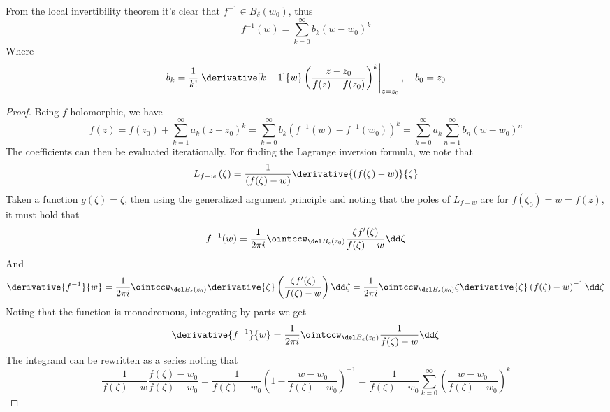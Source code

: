 \documentclass[../mmf.tex]{subfiles}
\begin{document}
\begin{thm}
	From the local invertibility theorem it's clear that $f^{-1}\in B_{\delta}(w_0)$, thus
	\begin{equation*}
		f^{-1}\left( w \right)=\sum_{k=0}^{\infty}b_k(w-w_0)^k
	\end{equation*}
	Where
	\begin{equation}
		b_k=\frac{1}{k!}\left.\derivative[k-1]{w}\left( \frac{z-z_0}{f(z)-f(z_0)} \right)^k\right|_{z=z_0}, \quad b_0=z_0
		\label{eq:lagrangeformula}
	\end{equation}
\end{thm}
\begin{proof}
	Being $f$ holomorphic, we have
	\begin{equation*}
		f(z)=f(z_0)+\sum_{k=1}^{\infty}a_k\left( z-z_0 \right)^k=\sum_{k=0}^{\infty}b_k\left( f^{-1}(w)-f^{-1}(w_0) \right)^k=\sum_{k=0}^{\infty}a_k\sum_{n=1}^{\infty}b_n\left( w-w_0 \right)^n
	\end{equation*}
	The coefficients can then be evaluated iterationally. For finding the Lagrange inversion formula, we note that
	\begin{equation*}
		L_{f-w}\left( \zeta \right)=\frac{1}{\left( f(\zeta)-w \right)}\derivative{\left( f(\zeta)-w \right)}{\zeta}
	\end{equation*}
	Taken a function $g(\zeta)=\zeta$, then using the generalized argument principle and noting that the poles of $L_{f-w}$ are for $f(\zeta_0)=w=f(z)$, it must hold that
	\begin{equation*}
		f^{-1}(w)= \frac{1}{2\pi i}\ointccw_{\del B_{\epsilon}(z_0)}\frac{\zeta f'(\zeta)}{f(\zeta)-w}\dd\zeta
	\end{equation*}
		And
	\begin{equation*}
		\derivative{f^{-1}}{w}=\frac{1}{2\pi i}\ointccw_{\del B_{\epsilon}(z_0)}\derivative{\zeta}\left( \frac{\zeta f'(\zeta)}{f(\zeta)-w} \right)\dd\zeta= \frac{1}{2\pi i}\ointccw_{\del B_{\epsilon}(z_0)}\zeta\derivative{\zeta}\left( f(\zeta)-w \right)^{-1}\dd\zeta
	\end{equation*}
	Noting that the function is monodromous, integrating by parts we get
	\begin{equation*}
		\derivative{f^{-1}}{w}=\frac{1}{2\pi i}\ointccw_{\del B_{\epsilon}(z_0)}\frac{1}{f(\zeta)-w}\dd\zeta
	\end{equation*}
	The integrand can be rewritten as a series noting that
	\begin{equation*}
		\frac{1}{f(\zeta)-w}\frac{f(\zeta)-w_0}{f(\zeta)-w_0}=\frac{1}{f(\zeta)-w_0}\left( 1-\frac{w-w_0}{f(\zeta)-w_0} \right)^{-1}=\frac{1}{f(\zeta)-w_0}\sum_{k=0}^{\infty}\left( \frac{w-w_0}{f(\zeta)-w_0} \right)^k

\end{equation*}
\end{proof}
\end{document}
